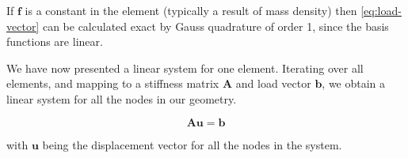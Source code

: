 If $\bm{f}$ is a constant in the element (typically a result of mass density) then \eqref{eq:load-vector} can be calculated exact by Gauss quadrature of order 1, since the basis functions are linear. 

We have now presented a linear system for one element. Iterating over all elements, and mapping to a stiffness matrix $\bm{A}$ and load vector $\bm{b}$, we obtain a linear system for all the nodes in our geometry. 

\begin{equation}
\bm{A} \bm{u} = \bm{b}
\end{equation}

with $\bm{u}$ being the displacement vector for all the nodes in the system. 